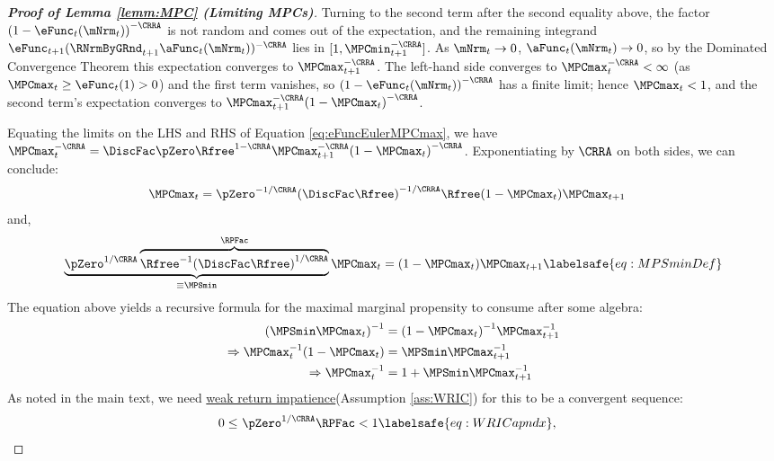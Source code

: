 \documentclass[\econtexRoot/BufferStockTheory]{subfiles}
\begin{document}
\begin{proof}[\textbf{Proof of Lemma \ref{lemm:MPC} (Limiting MPCs)}]
Turning to the second term after the second equality above, the factor ${(1-\eFunc_{t}(\mNrm_{t}))}^{-\CRRA}$ is not random and comes out of the expectation, and the remaining integrand $\eFunc_{t+1}(\RNrmByGRnd_{t+1}\aFunc_{t}(\mNrm_{t}))^{-\CRRA}$ lies in $[1,\MPCmin_{t+1}^{-\CRRA}]$.
As $\mNrm_{t} \rightarrow 0$, $\aFunc_{t}(\mNrm_{t})\rightarrow 0$, so by the Dominated Convergence Theorem this expectation converges to $\MPCmax _{t+1}^{-\CRRA}$.
The left-hand side converges to $\MPCmax_{t}^{-\CRRA}<\infty$ (as $\MPCmax_{t}\geq\eFunc_{t}(1)>0$) and the first term vanishes, so ${(1-\eFunc_{t}(\mNrm_{t}))}^{-\CRRA}$ has a finite limit; hence $\MPCmax_{t}<1$, and the second term's expectation converges to $\MPCmax _{t+1}^{-\CRRA
}{(1-\MPCmax _{t})}^{-\CRRA }$.


Equating the limits on the LHS and RHS of Equation \eqref{eq:eFuncEulerMPCmax}, we have $\MPCmax_{t}^{-\CRRA }=\DiscFac
\pZero\Rfree^{1-\CRRA }\MPCmax_{t+1}^{-\CRRA }{(1-\MPCmax
_{t})}^{-\CRRA }$.
Exponentiating by $\CRRA$ on both sides, we can conclude:
%
%
\begin{equation}\label{eq:mpcmaxiter}\begin{gathered}\begin{aligned}
\MPCmax_{t} & = \pZero^{-1/\CRRA} {(\DiscFac
\Rfree)}^{-1/\CRRA}\Rfree(1-\MPCmax _{t})\MPCmax _{t+1} \notag
\end{aligned}\end{gathered}\end{equation}
%
%
and, 
%
%
\begin{equation}
 \underbrace{\pZero^{1/\CRRA}\overbrace{{\Rfree}^{-1}{(\DiscFac
    \Rfree)}^{1/\CRRA}}^{\RPFac}}_{\equiv \MPSmin} \MPCmax_{t}  = (1-\MPCmax _{t})\MPCmax _{t+1} \labelsafe{eq:MPSminDef}
\end{equation}
%
%
The equation above yields a recursive formula for the maximal marginal propensity to consume after some algebra:
%
%
\begin{equation}\begin{gathered}\begin{aligned}
  {(\MPSmin \MPCmax_{t})}^{-1}  & = {(1-\MPCmax_{t})}^{-1}\MPCmax_{t+1}^{-1}  \notag
\\ \Rightarrow \MPCmax_{t}^{-1}(1-\MPCmax_{t})  & = \MPSmin \MPCmax_{t+1}^{-1}   \notag
\\ \Rightarrow  \MPCmax_{t}^{-1}  & = 1+\MPSmin \MPCmax_{t+1}^{-1} \label{eq:MPCmaxInvApndxIter}
\end{aligned}\end{gathered}\end{equation}
%
%
As noted in the main text, we need \hyperlink{WRIC}{weak return impatience}(Assumption \ref{ass:WRIC}) for this to be a convergent sequence:
\begin{equation}\begin{gathered}\begin{aligned}
  0 \leq & ~\pZero^{1/\CRRA} \RPFac < 1 \labelsafe{eq:WRICapndx},
\end{aligned}\end{gathered}\end{equation}


\end{proof}
\end{document}
